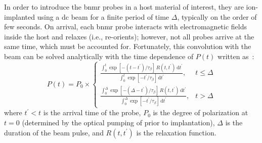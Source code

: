 \documentclass[
  aps,
  prb,
  twocolumn,
  reprint,
  superscriptaddress,
  floatfix,
  citeautoscript,
  longbibliography,
]{revtex4-2}
\newcommand{\latin}[1]{#1}
\begin{document}
In order to introduce the \gls{bnmr} probes in a host material of interest, they are ion-implanted using a \gls{dc} beam for a finite period of time $\Delta$, typically on the order of few seconds.
On arrival, each \gls{bnmr} probe interacts with electromagnetic fields inside the host and relaxes (\latin{i.e.}, re-orients);
however, not all probes arrive at the same time, which must be accounted for.
Fortunately, this convolution with the beam can be solved analytically with the time dependence of $P(t)$ written as~\cite{2006-Salman-PRL-96-147601, 2015-MacFarlane-PRB-92-064409}:
\begin{equation} \label{eq:polarization}
   P(t) = P_{0} \times
   \begin{cases}
      \frac{ \displaystyle \int_{0}^{t} \exp \left [ -\left ( t - t^{\prime} \right ) / \tau_{\beta} \right ] \, R \left (t,t^{\prime} \right ) \, \mathrm{d}t^{\prime} }{ \displaystyle \int_{0}^{t} \exp \left [ -t^{\prime} / \tau_{\beta} \right ] \, \mathrm{d}t^{\prime} }, & t \leq \Delta \\
      \frac{ \displaystyle \int_{0}^{\Delta} \exp \left [ - \left ( \Delta - t^{\prime} \right ) / \tau_{\beta} \right ] \,  R \left (t, t^{\prime} \right ) \, \mathrm{d}t^{\prime} }{ \displaystyle \int_{0}^{\Delta} \exp \left [ -t^{\prime} / \tau_{\beta} \right ] \, \mathrm{d} t^{\prime} }, & t > \Delta
   \end{cases}
\end{equation}
where $t^{\prime} < t$ is the arrival time of the probe, $P_{0}$ is the degree of polarization at $t = 0$ (determined by the optical pumping of  prior to implantation), $\Delta$ is the duration of the beam pulse, and $R \left (t, t^{\prime} \right )$ is the relaxation function.
\end{document}
